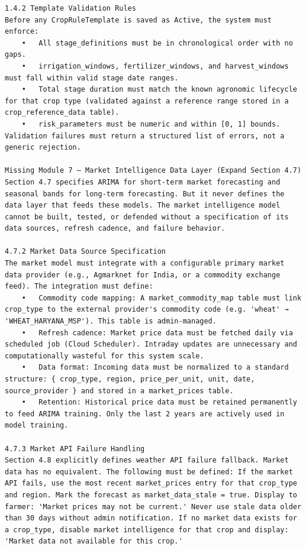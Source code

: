 \documentclass{article}
\begin{document}
\begin{verbatim}
1.4.2 Template Validation Rules
Before any CropRuleTemplate is saved as Active, the system must enforce:
	•	All stage_definitions must be in chronological order with no gaps.
	•	irrigation_windows, fertilizer_windows, and harvest_windows must fall within valid stage date ranges.
	•	Total stage duration must match the known agronomic lifecycle for that crop type (validated against a reference range stored in a crop_reference_data table).
	•	risk_parameters must be numeric and within [0, 1] bounds.
Validation failures must return a structured list of errors, not a generic rejection.

Missing Module 7 — Market Intelligence Data Layer (Expand Section 4.7)
Section 4.7 specifies ARIMA for short-term market forecasting and seasonal bands for long-term forecasting. But it never defines the data layer that feeds these models. The market intelligence model cannot be built, tested, or defended without a specification of its data sources, refresh cadence, and failure behavior.

4.7.2 Market Data Source Specification
The market model must integrate with a configurable primary market data provider (e.g., Agmarknet for India, or a commodity exchange feed). The integration must define:
	•	Commodity code mapping: A market_commodity_map table must link crop_type to the external provider's commodity code (e.g. 'wheat' → 'WHEAT_HARYANA_MSP'). This table is admin-managed.
	•	Refresh cadence: Market price data must be fetched daily via scheduled job (Cloud Scheduler). Intraday updates are unnecessary and computationally wasteful for this system scale.
	•	Data format: Incoming data must be normalized to a standard structure: { crop_type, region, price_per_unit, unit, date, source_provider } and stored in a market_prices table.
	•	Retention: Historical price data must be retained permanently to feed ARIMA training. Only the last 2 years are actively used in model training.

4.7.3 Market API Failure Handling
Section 4.8 explicitly defines weather API failure fallback. Market data has no equivalent. The following must be defined: If the market API fails, use the most recent market_prices entry for that crop_type and region. Mark the forecast as market_data_stale = true. Display to farmer: 'Market prices may not be current.' Never use stale data older than 30 days without admin notification. If no market data exists for a crop_type, disable market intelligence for that crop and display: 'Market data not available for this crop.'


\end{verbatim}
\end{document}

